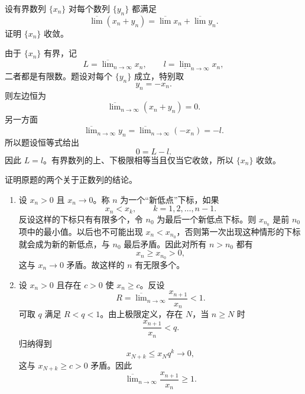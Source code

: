 \begin{xreferenceproblem}[第二组参考题 5]
设有界数列 $\{x_n\}$ 对每个数列 $\{y_n\}$ 都满足
\[
  \overline{\lim}(x_n+y_n)
  =\overline{\lim}x_n+\overline{\lim}y_n.
\]
证明 $\{x_n\}$ 收敛。
\end{xreferenceproblem}
\begin{xsolution}
由于 $\{x_n\}$ 有界，记
\[
  L=\overline{\lim}_{n\to\infty}x_n,
  \qquad
  l=\underline{\lim}_{n\to\infty}x_n,
\]
二者都是有限数。题设对每个 $\{y_n\}$ 成立，特别取
\[
  y_n=-x_n.
\]
则左边恒为
\[
  \overline{\lim}_{n\to\infty}(x_n+y_n)=0.
\]
另一方面
\[
  \overline{\lim}_{n\to\infty}y_n
  =\overline{\lim}_{n\to\infty}(-x_n)=-l.
\]
所以题设恒等式给出
\[
  0=L-l.
\]
因此 $L=l$。有界数列的上、下极限相等当且仅当它收敛，所以 $\{x_n\}$ 收敛。
\end{xsolution}

\begin{xreferenceproblem}[第二组参考题 6]
证明原题的两个关于正数列的结论。
\end{xreferenceproblem}
\begin{xsolution}
\begin{enumerate}[label=(\arabic*)]
  \item 设 $x_n>0$ 且 $x_n\to0$。称 $n$ 为一个“新低点”下标，如果
  \[
    x_n<x_k,\qquad k=1,2,\ldots,n-1.
  \]
  反设这样的下标只有有限多个，令 $n_0$ 为最后一个新低点下标。则 $x_{n_0}$ 是前 $n_0$ 项中的最小值。以后也不可能出现 $x_n<x_{n_0}$，否则第一次出现这种情形的下标就会成为新的新低点，与 $n_0$ 最后矛盾。因此对所有 $n>n_0$ 都有
  \[
    x_n\geqslant x_{n_0}>0,
  \]
  这与 $x_n\to0$ 矛盾。故这样的 $n$ 有无限多个。

  \item 设 $x_n>0$ 且存在 $c>0$ 使 $x_n\geqslant c$。反设
  \[
    R=\overline{\lim}_{n\to\infty}\frac{x_{n+1}}{x_n}<1.
  \]
  可取 $q$ 满足 $R<q<1$。由上极限定义，存在 $N$，当 $n\geqslant N$ 时
  \[
    \frac{x_{n+1}}{x_n}<q.
  \]
  归纳得到
  \[
    x_{N+k}\leqslant x_Nq^k\to0,
  \]
  这与 $x_{N+k}\geqslant c>0$ 矛盾。因此
  \[
    \overline{\lim}_{n\to\infty}\frac{x_{n+1}}{x_n}\geqslant1.
  \]
\end{enumerate}
\end{xsolution}

